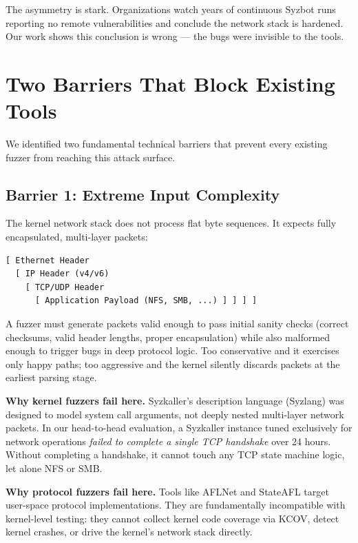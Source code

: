 \documentclass[10pt]{article}
\begin{document}
The asymmetry is stark. Organizations watch years of continuous Syzbot runs reporting no remote vulnerabilities and conclude the network stack is hardened. Our work shows this conclusion is wrong --- the bugs were invisible to the tools.

\section{Two Barriers That Block Existing Tools}

We identified two fundamental technical barriers that prevent every existing fuzzer from reaching this attack surface.

\subsection{Barrier 1: Extreme Input Complexity}

The kernel network stack does not process flat byte sequences. It expects fully encapsulated, multi-layer packets:

\begin{lstlisting}
[ Ethernet Header
  [ IP Header (v4/v6)
    [ TCP/UDP Header
      [ Application Payload (NFS, SMB, ...) ] ] ] ]
\end{lstlisting}

A fuzzer must generate packets valid enough to pass initial sanity checks (correct checksums, valid header lengths, proper encapsulation) while also malformed enough to trigger bugs in deep protocol logic. Too conservative and it exercises only happy paths; too aggressive and the kernel silently discards packets at the earliest parsing stage.

\textbf{Why kernel fuzzers fail here.} Syzkaller's description language (Syzlang) was designed to model system call arguments, not deeply nested multi-layer network packets. In our head-to-head evaluation, a Syzkaller instance tuned exclusively for network operations \emph{failed to complete a single TCP handshake} over 24 hours. Without completing a handshake, it cannot touch any TCP state machine logic, let alone NFS or SMB.

\textbf{Why protocol fuzzers fail here.} Tools like AFLNet and StateAFL target user-space protocol implementations. They are fundamentally incompatible with kernel-level testing: they cannot collect kernel code coverage via KCOV, detect kernel crashes, or drive the kernel's network stack directly.
\end{document}
